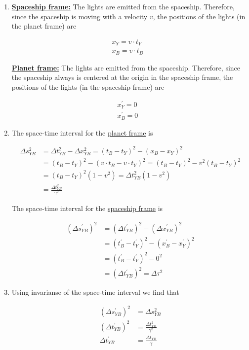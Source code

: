 \documentclass[a4paper,10pt,english]{article}
\begin{document}
\begin{enumerate}
\begin{enumerate}
\item
\underline{\bf{Spaceship frame:}} The lights are emitted from the spaceship. Therefore, since the spaceship is moving with a velocity $v$, the positions of the lights (in the planet frame) are

\begin{align*}
x_Y=v\cdot t_Y&\\
x_B=v\cdot t_B
\end{align*} 

\underline{\bf{Planet frame:}} The lights are emitted from the spaceship. Therefore, since the spaceship always is centered at the origin in the spaceship frame, the positions of the lights (in the spaceship frame) are

\begin{align*}
x^{\prime}_Y=0&\\
x^{\prime}_B=0
\end{align*} 

\item The space-time interval for the \underline{planet frame} is

\begin{align*}
\Delta s_{YB}^2&=\Delta t_{YB}^2-\Delta x_{YB}^2=\left(t_B-t_Y\right)^2-\left(x_B-x_Y\right)^2\\&=\left(t_B-t_Y\right)^2-\left(v\cdot t_B-v\cdot t_Y\right)^2=\left(t_B-t_Y\right)^2-v^2\left(t_B-t_Y\right)^2\\&=\left(t_B-t_Y\right)^2(1-v^2)=\Delta t_{YB}^2(1-v^2)\\&=\frac{\Delta t_{YB}^2}{\gamma^2}
\end{align*}

The space-time interval for the \underline{spaceship frame} is

\begin{align*}
(\Delta s_{YB}^{\prime})^2&=(\Delta t_{YB}^{\prime})^2-(\Delta x_{YB}^{\prime})^2\\&=\left(t_B^{\prime}-t_Y^{\prime}\right)^2-\left(x_B^{\prime}-x_Y^{\prime}\right)^2\\&=\left(t_B^{\prime}-t_Y^{\prime}\right)^2-0^2\\&=(\Delta t_{YB}^{\prime})^2=\Delta \tau^2
\end{align*}

\item Using invarianse of the space-time interval we find that

\begin{align*}
(\Delta s_{YB}^{\prime})^2&=\Delta s_{YB}^2\\
(\Delta t_{YB}^{\prime})^2&=\frac{\Delta t_{YB}^2}{\gamma^2}\\
\Delta t_{YB}^{\prime}&=\frac{\Delta t_{YB}}{\gamma}
\end{align*}


\end{enumerate}
\end{enumerate}
\end{document}
